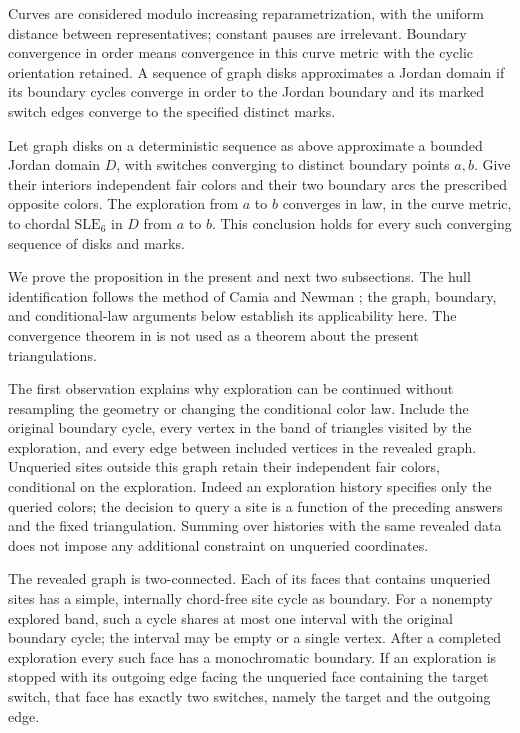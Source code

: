 Curves are considered modulo increasing reparametrization, with the
uniform distance between representatives; constant pauses are
irrelevant.  Boundary convergence in order means convergence in this
curve metric with the cyclic orientation retained.  A sequence of graph
disks approximates a Jordan domain if its boundary cycles converge in
order to the Jordan boundary and its marked switch edges converge to the
specified distinct marks.

\begin{proposition}
\label{prop:chordal}
Let graph disks on a deterministic sequence as above approximate a
bounded Jordan domain $D$, with switches converging to distinct boundary
points $a,b$.  Give their interiors independent fair colors and their
two boundary arcs the prescribed opposite colors.  The exploration from
$a$ to $b$ converges in law, in the curve metric, to chordal
$\mathrm{SLE}_6$ in $D$ from $a$ to $b$.  This conclusion holds for every
such converging sequence of disks and marks.
\end{proposition}

We prove the proposition in the present and next two subsections.  The hull
identification follows the method of Camia and Newman
\cite{cnexploration}; the graph, boundary, and conditional-law arguments
below establish its applicability here.  The convergence theorem in
\cite{cnexploration} is not used as a theorem about the present
triangulations.

The first observation explains why exploration can be continued without
resampling the geometry or changing the conditional color law.  Include
the original boundary cycle, every vertex in the band of triangles
visited by the exploration, and every edge between included vertices in
the revealed graph.  Unqueried sites outside this graph retain their
independent fair colors, conditional on the exploration.  Indeed an
exploration history specifies only the queried colors; the decision to
query a site is a function of the preceding answers and the fixed
triangulation.  Summing over histories with the same revealed data does
not impose any additional constraint on unqueried coordinates.

\begin{lemma}
\label{lem:revealed-faces}
The revealed graph is two-connected.  Each of its faces that contains
unqueried sites has a simple, internally chord-free site cycle as
boundary.  For a nonempty explored band, such a cycle shares at most one interval
with the original boundary cycle; the interval may be empty or a single
vertex.  After a
completed exploration every such face has a monochromatic boundary.
If an exploration is stopped with its outgoing edge facing the
unqueried face containing the target switch, that face has exactly two
switches, namely the target and the outgoing edge.
\end{lemma}

